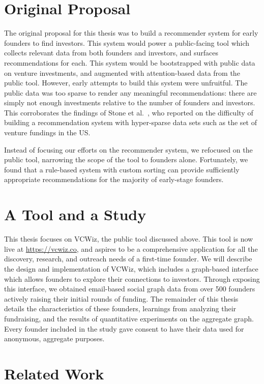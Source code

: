 \section{Original Proposal}

The original proposal for this thesis was to build a recommender system for early founders to find investors. This system would power a public-facing tool which collects relevant data from both founders and investors, and surfaces recommendations for each. This system would be bootstrapped with public data on venture investments, and augmented with attention-based data from the public tool. However, early attempts to build this system were unfruitful. The public data was too sparse to render any meaningful recommendations: there are simply not enough investments relative to the number of founders and investors. This corroborates the findings of Stone et al.~\cite{Stone:2013:EST:2541167.2507882}, who reported on the difficulty of building a recommendation system with hyper-sparse data sets such as the set of venture fundings in the US.

Instead of focusing our efforts on the recommender system, we refocused on the public tool, narrowing the scope of the tool to founders alone. Fortunately, we found that a rule-based system with custom sorting can provide sufficiently appropriate recommendations for the majority of early-stage founders.

\section{A Tool and a Study}

This thesis focuses on VCWiz, the public tool discussed above. This tool is now live at \url{https://vcwiz.co}, and aspires to be a comprehensive application for all the discovery, research, and outreach needs of a first-time founder. We will describe the design and implementation of VCWiz, which includes a graph-based interface which allows founders to explore their connections to investors. Through exposing this interface, we obtained email-based social graph data from over 500 founders actively raising their initial rounds of funding. The remainder of this thesis details the characteristics of these founders, learnings from analyzing their fundraising, and the results of quantitative experiments on the aggregate graph. Every founder included in the study gave consent to have their data used for anonymous, aggregate purposes.

\section{Related Work}


